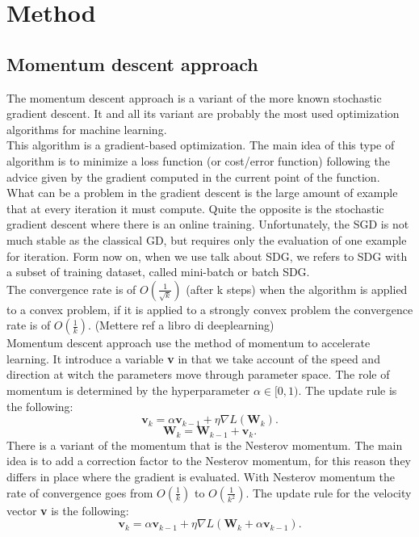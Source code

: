 \section{Method}

\subsection{Momentum descent approach}
The momentum descent approach is a variant of the more known stochastic gradient descent. It and all its variant are probably the most used optimization algorithms for machine learning.\\
This algorithm is a gradient-based optimization. The main idea of this type of algorithm is to minimize a loss function (or cost/error function) following the advice given by the gradient computed in the current point of the function.
\\
What can be a problem in the gradient descent is the large amount of example that at every iteration it must compute. Quite the opposite is the stochastic gradient descent where there is an online training. Unfortunately, the SGD is not much stable as the classical GD, but requires only the evaluation of one example for iteration. 
Form now on, when we use talk about SDG, we refers to SDG with a subset of training dataset, called mini-batch or batch SDG.
\\
The convergence rate is of $O(\frac{1}{\sqrt{k}})$ (after k steps) when the algorithm is applied to a convex problem, if it is applied to a strongly convex problem the convergence rate is of $O(\frac{1}{k})$. (Mettere ref a libro di deeplearning)
\\
Momentum descent approach use the method of momentum to accelerate learning. It introduce a variable \textbf{v} in that we take account of the speed and direction at witch the parameters move through parameter space. The role of momentum is determined by the hyperparameter $\alpha\in[0,1)$.
The update rule is the following:
\begin{equation}
\label{classical_momentum}
\textbf{v}_k = \alpha\textbf{v}_{k-1} + \eta\nabla\textit{L}(\textbf{W}_k).
\end{equation}
\begin{equation}
\label{update_momentum}
\textbf{W}_k = \textbf{W}_{k-1}  + \textbf{v}_k.
\end{equation}
There is a variant of the momentum that is the Nesterov momentum. The main idea is to add a correction factor to the Nesterov momentum,  for this reason they differs in place where the gradient is evaluated. With Nesterov momentum the rate of convergence goes from $O(\frac{1}{k})$ to $O(\frac{1}{k^2})$.
The update rule for the velocity vector \textbf{v} is the following:
\begin{equation}
\label{nesterov_momentum}
\textbf{v}_k = \alpha\textbf{v}_{k-1} + \eta\nabla\textit{L}(\textbf{W}_k + \alpha\textbf{v}_{k-1}).
\end{equation}
